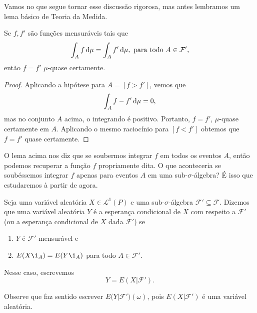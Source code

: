 Vamos no que segue tornar esse discussão rigorosa, mas antes lembramos um lema básico de Teoria da Medida.

\begin{lemma}
  \label{l:f_igual_fp}
  Se $f, f'$ são funções mensuráveis tais que
  \begin{equation}
    \int_A f \mathop{}\!\mathrm{d} \mu = \int_A f' \mathop{}\!\mathrm{d} \mu, \text{ para todo $A \in \mathcal{F}'$,}
  \end{equation}
  então $f = f'$ $\mu$-quase certamente.
\end{lemma}

\begin{proof}
  Aplicando a hipótese para $A = [f > f']$, vemos que
  \begin{equation}
    \int_A f - f' \mathop{}\!\mathrm{d} \mu = 0,
  \end{equation}
  mas no conjunto $A$ acima, o integrando é positivo.
  Portanto, $f = f'$, $\mu$-quase certamente em $A$.
  Aplicando o mesmo raciocínio para $[f < f']$ obtemos que $f = f'$ quase certamente.
\end{proof}

O lema acima nos diz que se soubermos integrar $f$ em todos os eventos $A$, então podemos recuperar a função $f$ propriamente dita.
O que aconteceria se soubéssemos integrar $f$ apenas para eventos $A$ em uma sub-$\sigma$-álgebra?
É isso que estudaremos à partir de agora.

\begin{definition}
  \label{d:esperanca_condicional}
  Seja uma variável aleatória $X \in \mathcal{L}^1(P)$ e uma sub-$\sigma$-álgebra $\mathcal{F}' \subseteq \mathcal{F}$.
  Dizemos que uma variável aleatória $Y$ é a esperança condicional  de $X$ com respeito a $\mathcal{F}'$ (ou a esperança condicional de $X$ dada $\mathcal{F}'$) se
  \begin{enumerate}[\quad a)]
  \item $Y$ é $\mathcal{F}'$-mensurável e
  \item $E(X \1_{A}) = E(Y \1_{A})$ para todo $A \in \mathcal{F}'$.
  \end{enumerate}
  Nesse caso, escrevemos
  \begin{equation}
    Y = E(X | \mathcal{F}').
  \end{equation}
\end{definition}

Observe que faz sentido escrever $E\big(Y|\mathcal{F}'\big)(\omega)$, pois $E(X|\mathcal{F}')$ é uma variável aleatória.


